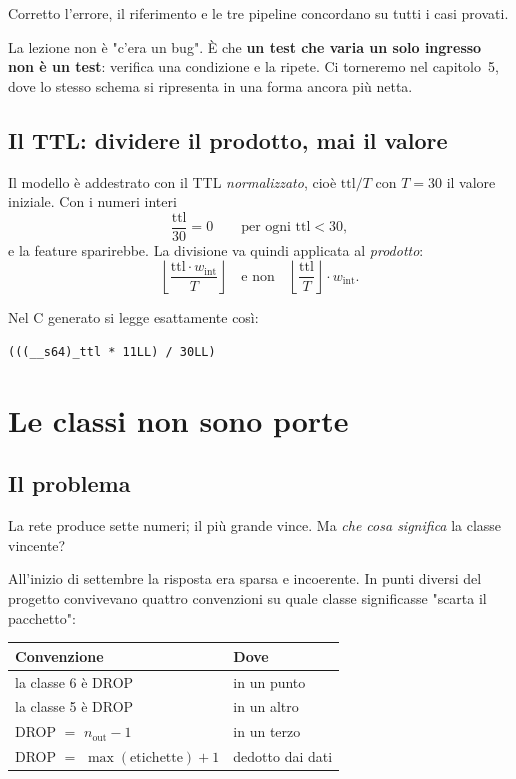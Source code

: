 \documentclass[11pt,a4paper,oneside]{report}
\begin{document}
Corretto l'errore, il riferimento e le tre pipeline concordano su tutti i casi
provati.

\begin{lezione}
La lezione non è "c'era un bug". È che \textbf{un test che varia un solo
ingresso non è un test}: verifica una condizione e la ripete. Ci torneremo nel
capitolo~5, dove lo stesso schema si ripresenta in una forma ancora più netta.
\end{lezione}

\section{Il TTL: dividere il prodotto, mai il valore}

Il modello è addestrato con il TTL \emph{normalizzato}, cioè
$\text{ttl}/T$ con $T = 30$ il valore iniziale. Con i numeri interi
\[
  \frac{\text{ttl}}{30} = 0 \qquad \text{per ogni } \text{ttl} < 30 ,
\]
e la feature sparirebbe. La divisione va quindi applicata al \emph{prodotto}:
\[
  \left\lfloor \frac{\text{ttl} \cdot w_{\text{int}}}{T} \right\rfloor
  \quad\text{e non}\quad
  \left\lfloor \frac{\text{ttl}}{T} \right\rfloor \cdot w_{\text{int}} .
\]

Nel C generato si legge esattamente così:
\begin{lstlisting}
(((__s64)_ttl * 11LL) / 30LL)
\end{lstlisting}

\chapter{Le classi non sono porte}
\label{ch:classi}

\section{Il problema}

La rete produce sette numeri; il più grande vince. Ma \emph{che cosa significa}
la classe vincente?

All'inizio di settembre la risposta era sparsa e incoerente. In punti diversi
del progetto convivevano quattro convenzioni su quale classe significasse
"scarta il pacchetto":

\begin{center}
\small
\begin{tabular}{@{}ll@{}}
\toprule
\textbf{Convenzione} & \textbf{Dove} \\
\midrule
la classe 6 è DROP & in un punto \\
la classe 5 è DROP & in un altro \\
DROP $=$ $n_{\text{out}} - 1$ & in un terzo \\
DROP $=$ $\max(\text{etichette}) + 1$ & dedotto dai dati \\
\bottomrule
\end{tabular}
\end{center}
\end{document}

